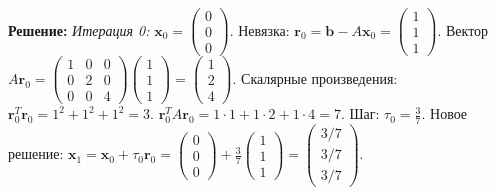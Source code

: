 \documentclass{article}
\begin{document}
\textbf{Решение:}
\textit{Итерация 0:} $\textbf{x}_0 = \begin{pmatrix} 0 \\ 0 \\ 0 \end{pmatrix}$.
Невязка: $\textbf{r}_0 = \textbf{b} - A\textbf{x}_0 = \begin{pmatrix} 1 \\ 1 \\ 1 \end{pmatrix}$.
Вектор $A\textbf{r}_0 = \begin{pmatrix} 1 & 0 & 0 \\ 0 & 2 & 0 \\ 0 & 0 & 4 \end{pmatrix} \begin{pmatrix} 1 \\ 1 \\ 1 \end{pmatrix} = \begin{pmatrix} 1 \\ 2 \\ 4 \end{pmatrix}$.
Скалярные произведения:
$\textbf{r}_0^T \textbf{r}_0 = 1^2 + 1^2 + 1^2 = 3$.
$\textbf{r}_0^T A \textbf{r}_0 = 1\cdot1 + 1\cdot2 + 1\cdot4 = 7$.
Шаг: $\tau_0 = \frac{3}{7}$.
Новое решение: $\textbf{x}_1 = \textbf{x}_0 + \tau_0 \textbf{r}_0 = \begin{pmatrix} 0 \\ 0 \\ 0 \end{pmatrix} + \frac{3}{7} \begin{pmatrix} 1 \\ 1 \\ 1 \end{pmatrix} = \begin{pmatrix} 3/7 \\ 3/7 \\ 3/7 \end{pmatrix}$.
\end{document}
